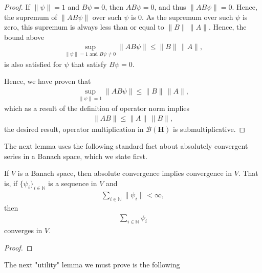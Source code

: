 \begin{proof}
If $\|\psi\| = 1$ and $B\psi = 0$, then $AB\psi = 0$, and thus $\|AB\psi\| = 0$. Hence, the supremum of $\|AB\psi\|$ over such $\psi$ is $0$. As the supremum over such $\psi$ is zero, this supremum is always less than or equal to $\|B\| \, \|A\|$. Hence, the bound above
\begin{align}
    \sup\limits_{\|\psi\| = 1 \text{ and } B\psi \neq 0} \|AB\psi\| \le \|B\| \, \|A\|,
\end{align}
is also satisfied for $\psi$ that satisfy $B\psi = 0$.

Hence, we have proven that
\begin{align}
    \sup\limits_{\|\psi\| = 1} \|AB\psi\| \le \|B\| \, \|A\|,
\end{align}
which as a result of the definition of operator norm implies
\begin{align}
    \|AB\| \le \|A\| \, \|B\|,
\end{align}
the desired result, operator multiplication in $\mathcal{B}(\mathbf{H})$ is submultiplicative.
\end{proof}

The next lemma uses the following standard fact about absolutely convergent series in a Banach space, which we state first.

\begin{proposition}
    \label{prpstn:hall-a.34}
    \leanok
    If $V$ is a Banach space, then absolute convergence implies convergence in $V$. That is, if $\{\psi_i\}_{i \in \mathbb{N}}$ is a sequence in $V$ and
    \begin{align}
        \sum\limits_{i \in \mathbb{N}} \|\psi_i\| < \infty,
    \end{align}
    then
    \begin{align}
        \sum\limits_{i \in \mathbb{N}} \psi_i
    \end{align}
    converges in $V$.
\end{proposition}
\begin{proof}
\leanok
\end{proof}

The next "utility" lemma we must prove is the following

